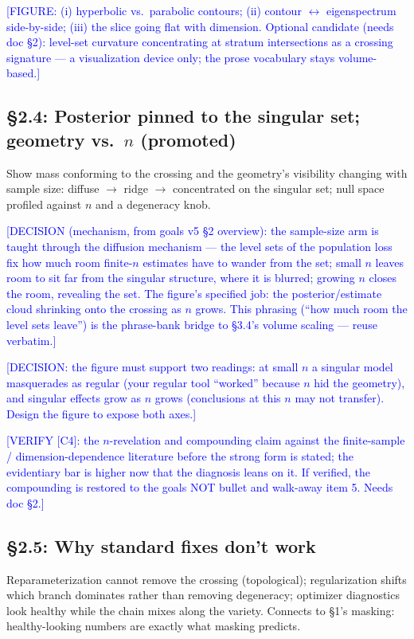 \documentclass[11pt]{article}
\newcommand{\tagg}[1]{\textcolor{blue}{[#1]}}
\begin{document}
\tagg{FIGURE: (i) hyperbolic vs.\ parabolic contours; (ii) contour
$\leftrightarrow$ eigenspectrum side-by-side; (iii) the slice going flat
with dimension. Optional candidate (needs doc \S2): level-set curvature
concentrating at stratum intersections as a crossing signature --- a
visualization device only; the prose vocabulary stays volume-based.}

\subsection*{\S2.4: Posterior pinned to the singular set; geometry vs.\
$n$ (promoted)}

Show mass conforming to the crossing and the geometry's visibility
changing with sample size: diffuse $\to$ ridge $\to$ concentrated on the
singular set; null space profiled against $n$ and a degeneracy knob.

\tagg{DECISION (mechanism, from goals v5 \S2 overview): the sample-size
arm is taught through the diffusion mechanism --- the level sets of the
population loss fix how much room finite-$n$ estimates have to wander
from the set; small $n$ leaves room to sit far from the singular
structure, where it is blurred; growing $n$ closes the room, revealing
the set. The figure's specified job: the posterior/estimate cloud
shrinking onto the crossing as $n$ grows. This phrasing (``how much room
the level sets leave'') is the phrase-bank bridge to \S3.4's volume
scaling --- reuse verbatim.}

\tagg{DECISION: the figure must support two readings: at small $n$ a
singular model masquerades as regular (your regular tool ``worked''
because $n$ hid the geometry), and singular effects grow as $n$ grows
(conclusions at this $n$ may not transfer). Design the figure to expose
both axes.}

\tagg{VERIFY [C4]: the $n$-revelation and compounding claim against the
finite-sample / dimension-dependence literature before the strong form
is stated; the evidentiary bar is higher now that the diagnosis leans on
it. If verified, the compounding is restored to the goals NOT bullet and
walk-away item 5. Needs doc \S2.}

\subsection*{\S2.5: Why standard fixes don't work}

Reparameterization cannot remove the crossing (topological);
regularization shifts which branch dominates rather than removing
degeneracy; optimizer diagnostics look healthy while the chain mixes
along the variety. Connects to \S1's masking: healthy-looking numbers
are exactly what masking predicts.
\end{document}
